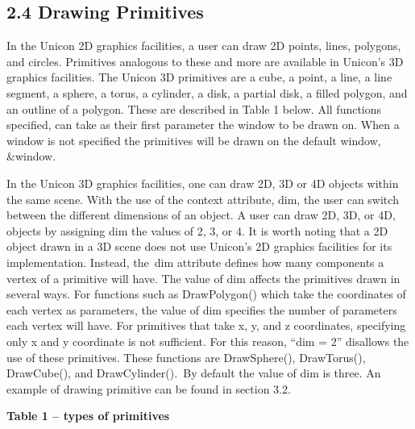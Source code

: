 \documentclass[letterpaper]{article}
\begin{document}
\bigskip

\subsection[2.4 Drawing Primitives]{2.4 Drawing Primitives}

In the Unicon 2D graphics facilities, a user can draw 2D points,
lines, polygons, and circles. Primitives analogous to these and more
are available in Unicon's 3D graphics facilities. The Unicon 3D
primitives are a cube, a point, a line, a line segment, a sphere, a
torus, a cylinder, a disk, a partial disk, a filled polygon, and an
outline of a polygon.  These are described in Table 1 below. All
functions specified, can take as their first parameter the window to
be drawn on. When a window is not specified the primitives will be
drawn on the default window, \textsf{\&window}.

In the Unicon 3D graphics facilities, one can draw 2D, 3D or 4D objects within the same scene. With the use of the
context attribute, \textsf{dim}, the user can switch between the different dimensions of an object. A user can draw 2D,
3D, or 4D, objects by assigning \textsf{dim} the values of 2, 3, or 4. It is worth noting that a 2D object drawn in a
3D scene does not use Unicon's 2D graphics facilities for its implementation. Instead, the\texttt{ }\textsf{dim}
attribute defines how many components a vertex of a primitive will have. The value of \textsf{dim} affects the
primitives drawn in several ways. For functions such as \textsf{DrawPolygon()} which take the coordinates of each
vertex as parameters, the value of \textsf{dim} specifies the number of parameters each vertex will have. For
primitives that take x, y, and z coordinates, specifying only x and y coordinate is not sufficient. For this reason,
\textsf{{}``dim = 2''} disallows the use of these primitives. These functions are \textsf{DrawSphere(), DrawTorus(),
DrawCube(), and DrawCylinder()}.\texttt{ }By default the value of \textsf{dim} is three. An example of drawing
primitive can be found in section 3.2.


\bigskip

{\centering{}\bfseries
Table 1 -- types of primitives
\par}
\end{document}
